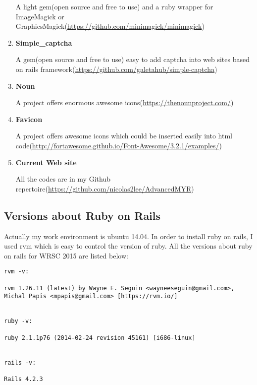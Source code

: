 \begin{enumerate}
A light gem(open source and free to use)  and a ruby wrapper for ImageMagick or GraphicsMagick(\url{https://github.com/minimagick/minimagick})

\item{\textbf{Simple\_captcha}}

A gem(open source and free to use)  easy to add captcha into web sites based on rails framework(\url{https://github.com/galetahub/simple-captcha})

\item{\textbf{Noun}}

A project offers enormous awesome icons(\url{https://thenounproject.com/})

\item{\textbf{Favicon}}

A project offers awesome icons which could be inserted easily into html code(\url{http://fortawesome.github.io/Font-Awesome/3.2.1/examples/})

\item{\textbf{Current Web site}}

All the codes are in my Github repertoire(\url{https://github.com/nicolas2lee/AdvancedMYR}) 
\end{enumerate}
\subsection{Versions about Ruby on Rails}
Actually my work environment is ubuntu 14.04.
In order to install ruby on rails, I used rvm which is easy to control the version of ruby.
All the versions about ruby on rails for WRSC 2015 are listed below:

\begin{lstlisting}
rvm -v:

rvm 1.26.11 (latest) by Wayne E. Seguin <wayneeseguin@gmail.com>, Michal Papis <mpapis@gmail.com> [https://rvm.io/]


ruby -v:

ruby 2.1.1p76 (2014-02-24 revision 45161) [i686-linux]


rails -v:

Rails 4.2.3
\end{lstlisting}
\newpage
